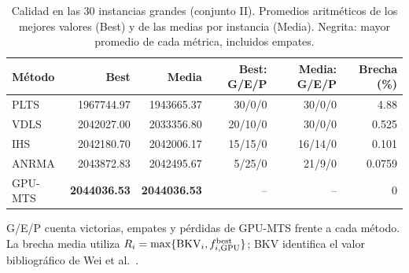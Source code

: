 \begin{table}[tbp]\centering\small
\caption{Calidad en las 30 instancias grandes (conjunto II). Promedios aritméticos de los mejores valores (Best) y de las medias por instancia (Media). Negrita: mayor promedio de cada métrica, incluidos empates.}
\label{tab:benchmark-large}
\begin{tabular}{lrrrrr}
\toprule
Método & Best & Media & Best: G/E/P & Media: G/E/P & Brecha (\%)\\
\midrule
PLTS & 1967744.97 & 1943665.37 & 30/0/0 & 30/0/0 & 4.88\\
VDLS & 2042027.00 & 2033356.80 & 20/10/0 & 30/0/0 & 0.525\\
IHS & 2042180.70 & 2042006.17 & 15/15/0 & 16/14/0 & 0.101\\
ANRMA & 2043872.83 & 2042495.67 & 5/25/0 & 21/9/0 & 0.0759\\
GPU-MTS & \textbf{2044036.53} & \textbf{2044036.53} & -- & -- & 0\\
\bottomrule\end{tabular}
\par\smallskip\parbox{.97\linewidth}{\footnotesize G/E/P cuenta victorias, empates y pérdidas de GPU-MTS frente a cada método. La brecha media utiliza $R_i=\max\{\mathrm{BKV}_i,f^{\mathrm{best}}_{i,\rm GPU}\}$; BKV identifica el valor bibliográfico de Wei et al.~\cite{Wei2026ANRMA}.}
\end{table}
